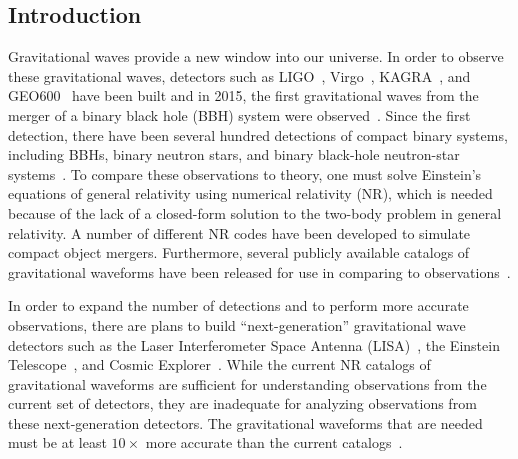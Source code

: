 \begin{bibunit}[unsrtnat]
\begin{abstract}
\end{abstract}

\section{Introduction\label{sec:dgscl introduction}}

Gravitational waves provide a new window into our universe. In order to observe
these gravitational waves, detectors such as LIGO~\cite{LIGOScientific:2014pky},
Virgo~\cite{VIRGO:2014yos}, KAGRA~\cite{2021PTEP.2021eA101A}, and
GEO600~\cite{Dooley:2015fpa} have been built and in 2015, the first
gravitational waves from the merger of a binary black hole (BBH) system were
observed~\cite{PhysRevLett.116.061102}. Since the first detection, there have
been several hundred detections of compact binary systems, including BBHs,
binary neutron stars, and binary black-hole neutron-star
systems~\cite{Capote:2024rmo}. To compare these observations to theory, one must
solve Einstein's equations of general relativity using numerical relativity
(NR), which is needed because of the lack of a closed-form solution to the
two-body problem in general relativity. A number of different NR codes have been
developed to simulate compact object mergers. Furthermore, several publicly
available catalogs of gravitational waveforms have been released for use in
comparing to observations~\cite{Mroue:2013xna, Jani:2016wkt, Healy:2017psd,
Healy:2019jyf, Boyle:2019kee, 2025sxscatalog, Healy:2020vre, Healy:2022wdn,
Ferguson:2023vta}.

In order to expand the number of detections and to perform more accurate
observations, there are plans to build ``next-generation'' gravitational
wave detectors such as the Laser Interferometer Space Antenna
(LISA)~\cite{2017arXiv170200786A}, the Einstein
Telescope~\cite{2010CQGra..27s4002P}, and Cosmic Explorer~\cite{Evans:2021gyd}.
While the current NR catalogs of gravitational waveforms are sufficient for
understanding observations from the current set of detectors, they are
inadequate for analyzing observations from these next-generation detectors.
The gravitational waveforms that are needed must be at least $10\times$ more
accurate than the current catalogs~\cite{Purrer:2019jcp, Ferguson:2020xnm,
Jan:2023raq}.


\end{bibunit}
